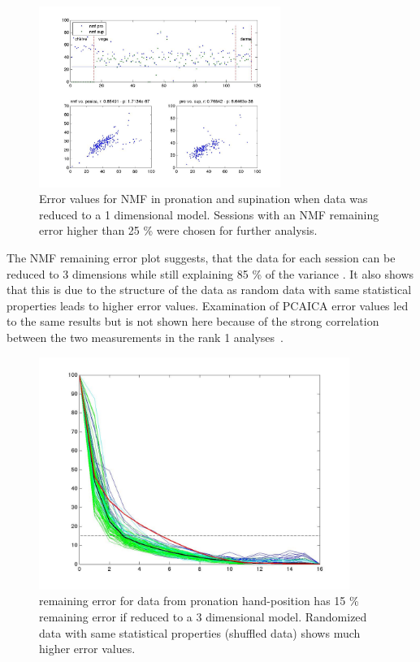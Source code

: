 \begin{figure}[ht]
	\centering
		\includegraphics[width=0.7\textwidth]{images/rank1.jpg}
	\caption{
Error values for NMF in pronation and supination when data was reduced to a 1 dimensional model. Sessions with an NMF remaining error higher than 25 \% were chosen for further analysis.
	}
	\label{sg:fig:images_rank1}
\end{figure}


The NMF remaining error plot suggests, that the data for each session can be reduced to 3 dimensions while still explaining 85 \% of the variance . It also shows that this is due to the structure of the data as random data with same statistical properties leads to higher error values. Examination of PCAICA error values led to the same results but is not shown here because of the strong correlation between the two measurements in the rank 1 analyses~.
\begin{figure}[ht]
	\centering
		\includegraphics[width=0.9\textwidth]{images/resid_test.jpg}
	\caption
	{
	remaining error for data from pronation hand-position has 15 \% remaining error if reduced to a 3 dimensional model. Randomized data with same statistical properties (shuffled data) shows much higher error values.
	}
	\label{sg:fig:images_all_resid_non}
\end{figure}


